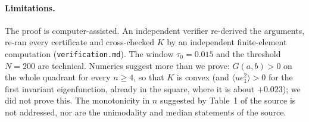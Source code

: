\documentclass[11pt,a4paper]{report}
\DeclareRobustCommand*{\avg}[1]{\langle #1\rangle}
\begin{document}
\paragraph{Limitations.} The proof is computer-assisted. An independent verifier re-derived the arguments, re-ran every certificate and
cross-checked \(K\) by an independent finite-element computation (\texttt{verification.md}). The window \(\tau_0=0.015\) and the threshold \(N=200\) are technical. Numerics suggest more than we prove:
\(G(a,b)>0\) on the whole quadrant for every \(n\ge4\), so that \(K\) is convex (and \(\avg{ue_1^2}>0\) for the first invariant eigenfunction, already in the square, where it is about \(+0.023\)); we did not prove this.
The monotonicity in \(n\) suggested by Table~1 of the source is not addressed, nor are the unimodality and median statements of the source.

\paperreferences
\end{document}
